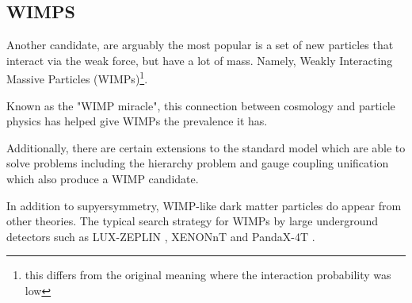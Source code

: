 \subsection{WIMPS}
\par
Another candidate, are arguably the most popular is a set of new particles that interact via the weak force, but have a lot of mass.
Namely, Weakly Interacting Massive Particles (WIMPs)\footnote{this differs from the original meaning where the interaction probability was low}. 



\par
Known as the "WIMP miracle", this connection between cosmology and particle physics has helped give WIMPs the prevalence it has.


\par
Additionally, there are certain extensions to the standard model which are able to solve problems including the hierarchy problem and gauge coupling unification which also produce a WIMP candidate.


\par
In addition to supyersymmetry, WIMP-like dark matter particles do appear from other theories.
The typical search strategy for WIMPs by large underground detectors such as LUX-ZEPLIN \cite{LZ_TechnicalDesignReview_ref}, XENONnT \cite{xenonnt_projected_sensitivty_ref} and PandaX-4T \cite{pandax_4t_ref}.